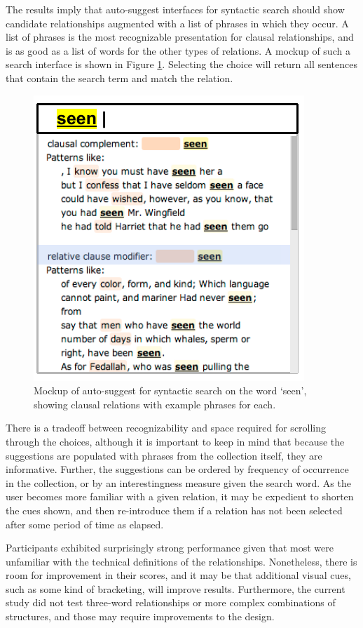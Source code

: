 
The results imply that auto-suggest interfaces for syntactic search should show candidate relationships augmented with a list of phrases in which they occur. A list of phrases is the most recognizable presentation for clausal relationships, and is as good as a list of words for the other types of relations. A mockup of such a search interface is shown in Figure \ref{fig:phrases-mockup}.  Selecting the choice will return all sentences that contain the search term and match the relation.
\begin{figure}
\centering
\includegraphics[width=0.5\columnwidth]{fig/phrases-mockup}
\caption{
	\label{fig:phrases-mockup} Mockup of auto-suggest for syntactic search on the word `seen', showing clausal relations with example phrases for each.
}
\end{figure}

There is a tradeoff between recognizability and space required for scrolling through the choices, although it is important to keep in mind that because the suggestions are populated with phrases from the collection itself, they are informative.    Further, the suggestions can be ordered by frequency of occurrence in the collection, or by an interestingness measure given the search word.  As the user becomes more familiar with a given relation, it may  be expedient to shorten the cues shown, and then re-introduce them if a relation has not been selected after some period of time as elapsed.

Participants exhibited surprisingly strong performance given that most were unfamiliar with the technical definitions of the relationships.  Nonetheless, there is room for improvement in their scores, and it may be that additional visual cues, such as some kind of bracketing, will improve results.  Furthermore, the current study did not test three-word relationships or more complex combinations of structures, and those may require improvements to the design.
